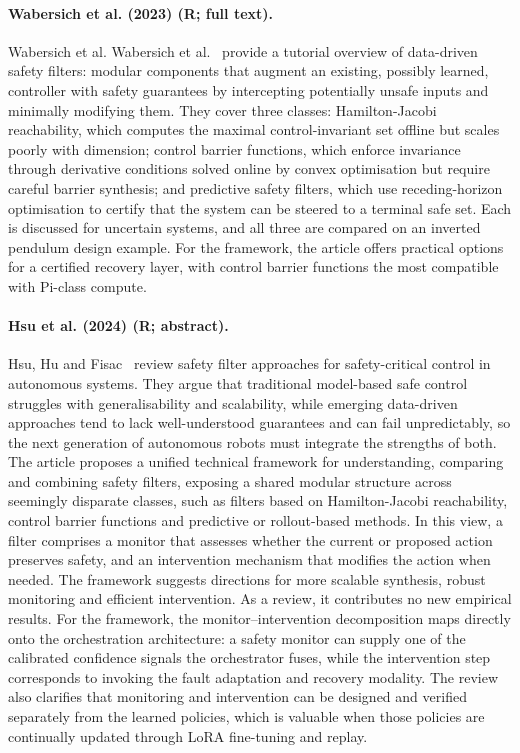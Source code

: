 \documentclass[10pt,a4paper]{article}
\begin{document}
\paragraph{Wabersich et al. (2023) (R; full text).} Wabersich et al. Wabersich et al.~\cite{Wabersich2023} provide a tutorial overview of data-driven safety filters: modular components that augment an existing, possibly learned, controller with safety guarantees by intercepting potentially unsafe inputs and minimally modifying them. They cover three classes: Hamilton-Jacobi reachability, which computes the maximal control-invariant set offline but scales poorly with dimension; control barrier functions, which enforce invariance through derivative conditions solved online by convex optimisation but require careful barrier synthesis; and predictive safety filters, which use receding-horizon optimisation to certify that the system can be steered to a terminal safe set. Each is discussed for uncertain systems, and all three are compared on an inverted pendulum design example. For the framework, the article offers practical options for a certified recovery layer, with control barrier functions the most compatible with Pi-class compute.

\paragraph{Hsu et al. (2024) (R; abstract).} Hsu, Hu and Fisac~\cite{Hsu2024} review safety filter approaches for safety-critical control in autonomous systems. They argue that traditional model-based safe control struggles with generalisability and scalability, while emerging data-driven approaches tend to lack well-understood guarantees and can fail unpredictably, so the next generation of autonomous robots must integrate the strengths of both. The article proposes a unified technical framework for understanding, comparing and combining safety filters, exposing a shared modular structure across seemingly disparate classes, such as filters based on Hamilton-Jacobi reachability, control barrier functions and predictive or rollout-based methods. In this view, a filter comprises a monitor that assesses whether the current or proposed action preserves safety, and an intervention mechanism that modifies the action when needed. The framework suggests directions for more scalable synthesis, robust monitoring and efficient intervention. As a review, it contributes no new empirical results. For the framework, the monitor--intervention decomposition maps directly onto the orchestration architecture: a safety monitor can supply one of the calibrated confidence signals the orchestrator fuses, while the intervention step corresponds to invoking the fault adaptation and recovery modality. The review also clarifies that monitoring and intervention can be designed and verified separately from the learned policies, which is valuable when those policies are continually updated through LoRA fine-tuning and replay.




\end{document}
